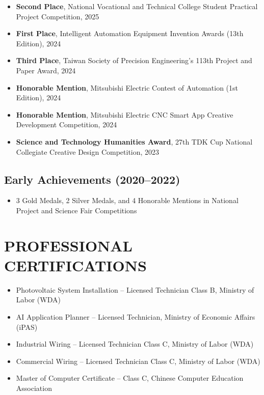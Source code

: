 \documentclass[11pt,a4paper]{article}
\begin{document}
\begin{itemize}[leftmargin=*, itemsep=2pt]
    \item \textbf{Second Place}, National Vocational and Technical College Student Practical Project Competition, 2025
    \item \textbf{First Place}, Intelligent Automation Equipment Invention Awards (13th Edition), 2024
    \item \textbf{Third Place}, Taiwan Society of Precision Engineering's 113th Project and Paper Award, 2024
    \item \textbf{Honorable Mention}, Mitsubishi Electric Contest of Automation (1st Edition), 2024
    \item \textbf{Honorable Mention}, Mitsubishi Electric CNC Smart App Creative Development Competition, 2024
    \item \textbf{Science and Technology Humanities Award}, 27th TDK Cup National Collegiate Creative Design Competition, 2023
\end{itemize}

\subsection*{Early Achievements (2020--2022)}

\begin{itemize}[leftmargin=*, itemsep=2pt]
    \item 3 Gold Medals, 2 Silver Medals, and 4 Honorable Mentions in National Project and Science Fair Competitions
\end{itemize}

\section*{PROFESSIONAL CERTIFICATIONS}

\begin{itemize}[leftmargin=*, itemsep=2pt]
    \item Photovoltaic System Installation -- Licensed Technician Class B, Ministry of Labor (WDA)
    \item AI Application Planner -- Licensed Technician, Ministry of Economic Affairs (iPAS)
    \item Industrial Wiring -- Licensed Technician Class C, Ministry of Labor (WDA)
    \item Commercial Wiring -- Licensed Technician Class C, Ministry of Labor (WDA)
    \item Master of Computer Certificate -- Class C, Chinese Computer Education Association
\end{itemize}
\end{document}
